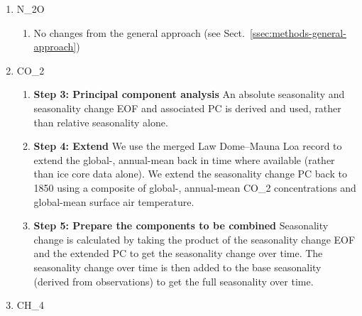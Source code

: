 \begin{enumerate}
    \item {
        N_2O

        \begin{enumerate}
            \item No changes from the general approach (see Sect.~\ref{ssec:methods-general-approach})
        \end{enumerate}
    }
    \item {
        CO_2

        \begin{enumerate}
            \item {
                \textbf{Step 3: Principal component analysis}
                An absolute seasonality and seasonality change EOF and associated PC is derived and used,
                rather than relative seasonality alone.
            }
            \item {
                \textbf{Step 4: Extend}
                We use the merged Law Dome--Mauna Loa record \citep{keeling_co2-exchanges_2001,rubino_law-dome-dataset_2019,etheridge_law-dome-co2_1996,macfarling-meure_law-dome_2006}
                to extend the global-, annual-mean back in time where available
                (rather than ice core data alone).
                We extend the seasonality change PC back to 1850
                using a composite of global-, annual-mean CO_2 concentrations and global-mean surface air temperature.
            }
            \item {
                \textbf{Step 5: Prepare the components to be combined}
                Seasonality change is calculated by taking the product of the seasonality change EOF and the extended PC
                to get the seasonality change over time.
                The seasonality change over time is then added to the base seasonality (derived from observations)
                to get the full seasonality over time.
            }
        \end{enumerate}
    }
    \item {
        CH_4

}
\end{enumerate}
